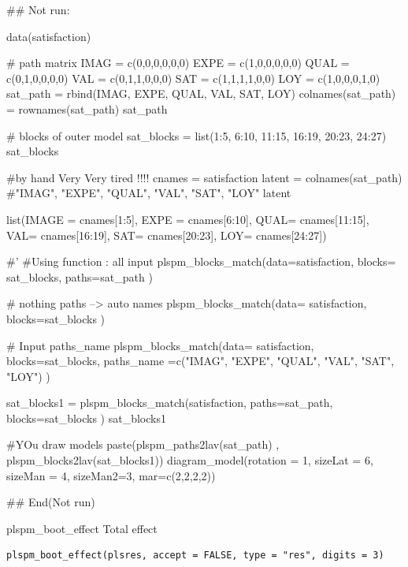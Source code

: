 \documentclass[a4paper]{book}
\begin{document}
\begin{Examples}
\begin{ExampleCode}

\#\# Not run: 

data(satisfaction)


# path matrix
IMAG = c(0,0,0,0,0,0)
EXPE = c(1,0,0,0,0,0)
QUAL = c(0,1,0,0,0,0)
VAL = c(0,1,1,0,0,0)
SAT = c(1,1,1,1,0,0)
LOY = c(1,0,0,0,1,0)
sat_path = rbind(IMAG, EXPE, QUAL, VAL, SAT, LOY)
colnames(sat_path) = rownames(sat_path)
sat_path

# blocks of outer model
sat_blocks = list(1:5, 6:10, 11:15, 16:19, 20:23, 24:27)
sat_blocks


#by hand Very Very tired !!!!
cnames = satisfaction%
latent = colnames(sat_path) #"IMAG", "EXPE", "QUAL", "VAL",  "SAT",  "LOY"
latent

list(IMAGE = cnames[1:5],
     EXPE = cnames[6:10],
     QUAL= cnames[11:15],
     VAL= cnames[16:19],
     SAT= cnames[20:23],
     LOY= cnames[24:27])

#' #Using function : all input
plspm_blocks_match(data=satisfaction, blocks= sat_blocks, paths=sat_path )

# nothing paths --> auto names
plspm_blocks_match(data= satisfaction, blocks=sat_blocks )

# Input paths_name
plspm_blocks_match(data= satisfaction, blocks=sat_blocks,
                   paths_name =c("IMAG", "EXPE", "QUAL", "VAL",  "SAT",  "LOY") )


sat_blocks1 = plspm_blocks_match(satisfaction, paths=sat_path, blocks=sat_blocks )
sat_blocks1

#YOu draw models
paste(plspm_paths2lav(sat_path) ,
      plspm_blocks2lav(sat_blocks1))%
  diagram_model(rotation = 1, sizeLat = 6, sizeMan = 4, sizeMan2=3,
                mar=c(2,2,2,2))

## End(Not run)

\end{ExampleCode}
\end{Examples}
%
\begin{Description}
plspm\_boot\_effect Total effect
\end{Description}
%
\begin{Usage}
\begin{verbatim}
plspm_boot_effect(plsres, accept = FALSE, type = "res", digits = 3)
\end{verbatim}
\end{Usage}
\end{document}
